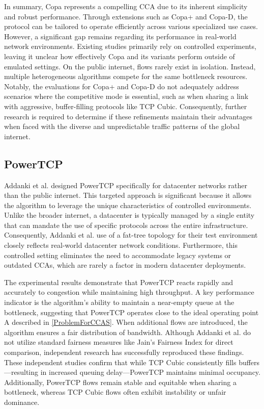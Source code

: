 In summary, Copa represents a compelling \acs{CCA} due to its inherent simplicity and robust performance. 
Through extensions such as Copa+ and Copa-D, the protocol can be tailored to operate efficiently across various specialized use cases. 
However, a significant gap remains regarding its performance in real-world network environments. 
Existing studies primarily rely on controlled experiments, leaving it unclear how effectively Copa and its variants perform outside of emulated settings.
On the public internet, flows rarely exist in isolation.
Instead, multiple heterogeneous algorithms compete for the same bottleneck resources. 
Notably, the evaluations for Copa+ and Copa-D do not adequately address scenarios where the competitive mode is essential, such as when sharing a link with aggressive, buffer-filling protocols like TCP Cubic. 
Consequently, further research is required to determine if these refinements maintain their advantages when faced with the diverse and unpredictable traffic patterns of the global internet.

\subsection{PowerTCP}

Addanki et al. \cite{PowerTCP} designed PowerTCP specifically for datacenter networks rather than the public internet. 
This targeted approach is significant because it allows the algorithm to leverage the unique characteristics of controlled environments. 
Unlike the broader internet, a datacenter is typically managed by a single entity that can mandate the use of specific protocols across the entire infrastructure. 
Consequently, Addanki et al. use of a fat-tree topology for their test environment closely reflects real-world datacenter network conditions. 
Furthermore, this controlled setting eliminates the need to accommodate legacy systems or outdated \acs{CCA}s, which are rarely a factor in modern datacenter deployments.

The experimental results demonstrate that PowerTCP reacts rapidly and accurately to congestion while maintaining high throughput. 
A key performance indicator is the algorithm's ability to maintain a near-empty queue at the bottleneck, suggesting that PowerTCP operates close to the ideal operating point A described in \ref{ProblemForCCAS}. 
When additional flows are introduced, the algorithm ensures a fair distribution of bandwidth. 
Although Addanki et al. do not utilize standard fairness measures like Jain's Fairness Index for direct comparison, independent research \cite{TCPSTHIRDEYE} has successfully reproduced these findings. 
These independent studies confirm that while TCP Cubic consistently fills buffers—resulting in increased queuing delay—PowerTCP maintains minimal occupancy. 
Additionally, PowerTCP flows remain stable and equitable when sharing a bottleneck, whereas TCP Cubic flows often exhibit instability or unfair dominance.

